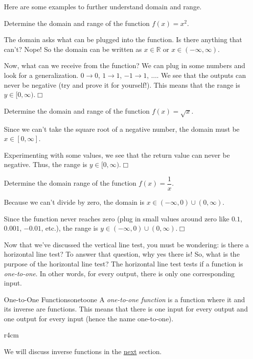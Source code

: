 \documentclass[../book.tex]{subfiles}
\begin{document}
Here are some examples to further understand domain and range.
\begin{example}
Determine the domain and range of the function $f(x)=x^2$.
\end{example}
\begin{solution}
The domain asks what can be plugged into the function.  Is there anything that can't?  Nope!  So the domain can be written as $x\in\mathbb{R}$ or $x\in(-\infty,\infty)$.

Now, what can we receive from the function?  We can plug in some numbers and look for a generalization.  $0 \to 0$, $1 \to 1$, $-1 \to 1$, $\ldots$.  We see that the outputs can never be negative (try and prove it for yourself!).  This means that the range is $y\in[0,\infty)$.$\Box$
\end{solution}
\begin{example}
Determine the domain and range of the function $f(x)=\sqrt{x}$.
\end{example}
\begin{solution}
Since we can't take the square root of a negative number, the domain must be $x\in[0,\infty]$.

Experimenting with some values, we see that the return value can never be negative.  Thus, the range is $y\in[0,\infty)$.$\Box$
\end{solution}
\begin{example}
Determine the domain range of the function $f(x)=\dfrac{1}{x}$.
\end{example}
\begin{solution}
Because we can't divide by zero, the domain is $x\in(-\infty,0)\cup(0,\infty)$.

Since the function never reaches zero (plug in small values around zero like $0.1$, $0.001$, $-0.01$, etc.), the range is $y\in(-\infty,0)\cup(0,\infty)$.$\Box$
\end{solution}
Now that we've discussed the vertical line test, you must be wondering: is there a horizontal line test?  To answer that question, why yes there is! So, what is the purpose of the horizontal line test? The horizontal line test tests if a function is \textit{one-to-one}.  In other words, for every output, there is only one corresponding input.  
\begin{definition}{One-to-One Functions}{onetoone}
A \textit{one-to-one function} is a function where it and its inverse are functions.  This means that there is one input for every output and one output for every input (hence the name one-to-one).
\end{definition}
\begin{wrapfigure}{r}{4cm}
\end{wrapfigure}
We will discuss inverse functions in the \hyperlink{section.2.3}{next} section.
\end{document}
